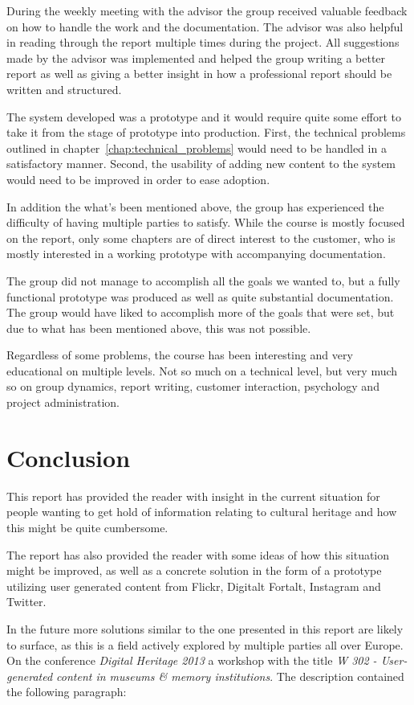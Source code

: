 \documentclass[11pt]{book}
\begin{document}
During the weekly meeting with the advisor the group received valuable feedback on how to handle the work and the documentation. The advisor was also helpful in reading through the report multiple times during the project. All suggestions made by the advisor was implemented and helped the group writing a better report as well as giving a better insight in how a professional report should be written and structured.

The system developed was a prototype and it would require quite some effort to take it from the stage of prototype into production. First, the technical problems outlined in chapter~\ref{chap:technical_problems} would need to be handled in a satisfactory manner. Second, the usability of adding new content to the system would need to be improved in order to ease adoption.

In addition the what's been mentioned above, the group has experienced the difficulty of having multiple parties to satisfy. While the course is mostly focused on the report, only some chapters are of direct interest to the customer, who is mostly interested in a working prototype with accompanying documentation.

The group did not manage to accomplish all the goals we wanted to, but a fully functional prototype was produced as well as quite substantial documentation. The group would have liked to accomplish more of the goals that were set, but due to what has been mentioned above, this was not possible.

Regardless of some problems, the course has been interesting and very educational on multiple levels. Not so much on a technical level, but very much so on group dynamics, report writing, customer interaction, psychology and project administration.

\chapter{Conclusion}
This report has provided the reader with insight in the current situation for people wanting to get hold of information relating to cultural heritage and how this might be quite cumbersome. 

The report has also provided the reader with some ideas of how this situation might be improved, as well as a concrete solution in the form of a prototype utilizing user generated content from Flickr, Digitalt Fortalt, Instagram and Twitter.

In the future more solutions similar to the one presented in this report are likely to surface, as this is a field actively explored by multiple parties all over Europe.
On the conference \emph{Digital Heritage 2013} a workshop with the title \emph{W 302 - User-generated content in museums \& memory institutions}. The description contained the following paragraph:
\end{document}
